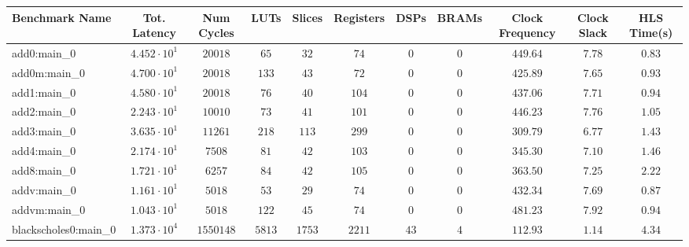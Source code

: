 \begin{tabular}{|l|c|c|c|c|c|c|c|c|c|c|}
\hline
Benchmark Name                 & Tot. Latency           & Num Cycles   & LUTs       & Slices     & Registers  & DSPs     & BRAMs    & Clock Frequency & Clock Slack & HLS Time(s) \\
\hline
add0:main\_0                   & $ 4.452 \cdot 10^{1} $ & $ 20018    $ & $ 65     $ & $ 32     $ & $ 74     $ & $ 0    $ & $ 0    $ & $ 449.64      $ & $ 7.78    $ & $ 0.83    $ \\
add0m:main\_0                  & $ 4.700 \cdot 10^{1} $ & $ 20018    $ & $ 133    $ & $ 43     $ & $ 72     $ & $ 0    $ & $ 0    $ & $ 425.89      $ & $ 7.65    $ & $ 0.93    $ \\
add1:main\_0                   & $ 4.580 \cdot 10^{1} $ & $ 20018    $ & $ 76     $ & $ 40     $ & $ 104    $ & $ 0    $ & $ 0    $ & $ 437.06      $ & $ 7.71    $ & $ 0.94    $ \\
add2:main\_0                   & $ 2.243 \cdot 10^{1} $ & $ 10010    $ & $ 73     $ & $ 41     $ & $ 101    $ & $ 0    $ & $ 0    $ & $ 446.23      $ & $ 7.76    $ & $ 1.05    $ \\
add3:main\_0                   & $ 3.635 \cdot 10^{1} $ & $ 11261    $ & $ 218    $ & $ 113    $ & $ 299    $ & $ 0    $ & $ 0    $ & $ 309.79      $ & $ 6.77    $ & $ 1.43    $ \\
add4:main\_0                   & $ 2.174 \cdot 10^{1} $ & $ 7508     $ & $ 81     $ & $ 42     $ & $ 103    $ & $ 0    $ & $ 0    $ & $ 345.30      $ & $ 7.10    $ & $ 1.46    $ \\
add8:main\_0                   & $ 1.721 \cdot 10^{1} $ & $ 6257     $ & $ 84     $ & $ 42     $ & $ 105    $ & $ 0    $ & $ 0    $ & $ 363.50      $ & $ 7.25    $ & $ 2.22    $ \\
addv:main\_0                   & $ 1.161 \cdot 10^{1} $ & $ 5018     $ & $ 53     $ & $ 29     $ & $ 74     $ & $ 0    $ & $ 0    $ & $ 432.34      $ & $ 7.69    $ & $ 0.87    $ \\
addvm:main\_0                  & $ 1.043 \cdot 10^{1} $ & $ 5018     $ & $ 122    $ & $ 45     $ & $ 74     $ & $ 0    $ & $ 0    $ & $ 481.23      $ & $ 7.92    $ & $ 0.94    $ \\
blackscholes0:main\_0          & $ 1.373 \cdot 10^{4} $ & $ 1550148  $ & $ 5813   $ & $ 1753   $ & $ 2211   $ & $ 43   $ & $ 4    $ & $ 112.93      $ & $ 1.14    $ & $ 4.34    $ \\

\end{tabular}
